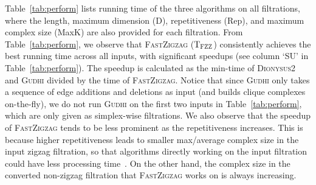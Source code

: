 \documentclass[letterpaper,11pt]{article}
\theoremstyle{mythmstyle}
\theoremstyle{mydefstyle}
\theoremstyle{plain}
\theoremstyle{definition}
\newcommand{\<}[1]{\langle #1\rangle}
\newcommand{\Gudhi}{\textsc{Gudhi}}
\newcommand{\Dionysustwo}{\textsc{Dionysus2}}
\begin{document}
Table~\ref{tab:perform} lists running time of the 
three algorithms on all filtrations,
where the length, maximum dimension (D),
repetitiveness (Rep), and maximum complex size (MaxK) 
are also provided for each filtration.
From Table~\ref{tab:perform}, we observe that \textsc{FastZigzag} ($\text{T}_\textsc{FZZ}$) consistently
achieves the best running time across all inputs, 
with significant speedups (see column `SU' in Table~\ref{tab:perform}).
The speedup is calculated as the min-time of \Dionysustwo{} and \Gudhi{}
divided by the time of \textsc{FastZigzag}.
Notice that since \Gudhi{} only takes a sequence of edge additions
and deletions as input (and builds clique complexes on-the-fly),
we do not run \Gudhi{} on the first two inputs in Table~\ref{tab:perform}, 
which are only given as simplex-wise filtrations.
We also observe that the speedup of \textsc{FastZigzag} tends to be less prominent
as the repetitiveness increases.
This is because higher repetitiveness leads to smaller max/average complex size
in the input zigzag filtration,
so that algorithms directly working on the input filtration
could have less processing time~\cite{carlsson2009zigzag-realvalue,maria2014zigzag,maria2019discrete}.
On the other hand, the complex size
in the converted non-zigzag filtration that \textsc{FastZigzag} works on is always increasing.
\end{document}

